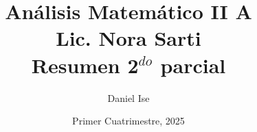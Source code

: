 \documentclass[11pt]{article}
\title{Análisis Matemático II A\\Lic. Nora Sarti\\Resumen 2\(^{do}\) parcial}
\author{Daniel Ise}
\date{Primer Cuatrimestre, 2025}
\begin{document}
\maketitle

\tableofcontents

\pagebreak




\end{document}
